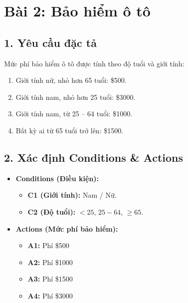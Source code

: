 \documentclass[11pt,a4paper]{article}
\begin{document}
\section*{Bài 2: Bảo hiểm ô tô}

\subsection*{1. Yêu cầu đặc tả}
Mức phí bảo hiểm ô tô được tính theo độ tuổi và giới tính:
\begin{enumerate}[noitemsep]
    \item Giới tính nữ, nhỏ hơn 65 tuổi: \$500.
    \item Giới tính nam, nhỏ hơn 25 tuổi: \$3000.
    \item Giới tính nam, từ 25 -- 64 tuổi: \$1000.
    \item Bất kỳ ai từ 65 tuổi trở lên: \$1500.
\end{enumerate}

\subsection*{2. Xác định Conditions \& Actions}
\begin{itemize}[noitemsep]
    \item \textbf{Conditions (Điều kiện):}
    \begin{itemize}[noitemsep]
        \item \textbf{C1 (Giới tính):} Nam / Nữ.
        \item \textbf{C2 (Độ tuổi):} $< 25$, $25 - 64$, $\ge 65$.
    \end{itemize}
    \item \textbf{Actions (Mức phí bảo hiểm):}
    \begin{itemize}[noitemsep]
        \item \textbf{A1:} Phí \$500
        \item \textbf{A2:} Phí \$1000
        \item \textbf{A3:} Phí \$1500
        \item \textbf{A4:} Phí \$3000
    \end{itemize}
\end{itemize}
\end{document}
